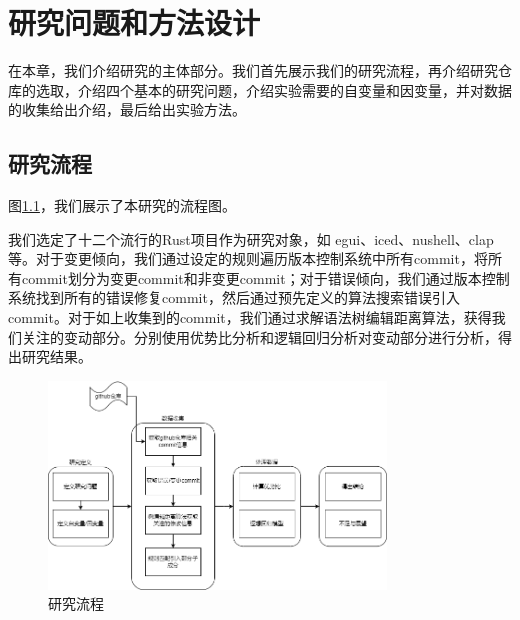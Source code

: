 \chapter{研究问题和方法设计}
在本章，我们介绍研究的主体部分。我们首先展示我们的研究流程，再介绍研究仓库的选取，介绍四个基本的研究问题，介绍实验需要的自变量和因变量，并对数据的收集给出介绍，最后给出实验方法。

\section{研究流程}
图\ref{fig:image1}，我们展示了本研究的流程图。

我们选定了十二个流行的Rust项目作为研究对象，如 egui、iced、nushell、clap 等。对于变更倾向，我们通过设定的规则遍历版本控制系统中所有commit，将所有commit划分为变更commit和非变更commit；对于错误倾向，我们通过版本控制系统找到所有的错误修复commit，然后通过预先定义的算法搜索错误引入commit。对于如上收集到的commit，我们通过求解语法树编辑距离算法，获得我们关注的变动部分。分别使用优势比分析和逻辑回归分析对变动部分进行分析，得出研究结果。

\begin{figure}[htbp]
  \centering
  \includegraphics[width=0.8\textwidth]{picture/study_process.png}
  \caption{研究流程}
  \label{fig:image1}
\end{figure}

